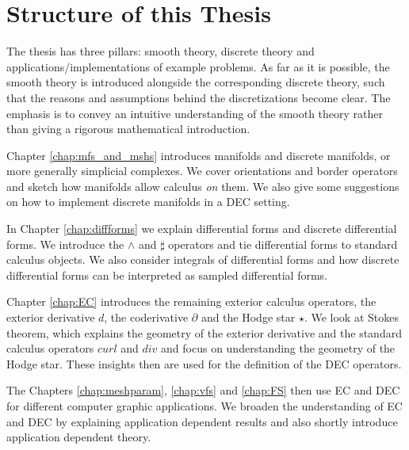 
\section{Structure of this Thesis}
The thesis has three pillars: smooth theory, discrete theory and applications/implementations of example problems. As far as it is possible, the smooth theory is introduced alongside the corresponding discrete theory, such that the reasons and assumptions behind the discretizations become clear. The emphasis is to convey an intuitive understanding of the smooth theory rather than giving a rigorous mathematical introduction. 

Chapter \ref{chap:mfs_and_mshs} introduces manifolds and discrete manifolds, or more generally simplicial complexes. We cover orientations and border operators and sketch how manifolds allow calculus \emph{on} them. We also give some suggestions on how to implement discrete manifolds in a DEC setting.

In Chapter \ref{chap:diffforms} we explain differential forms and discrete differential forms. We introduce the $\wedge$ and $\sharp$ operators and tie  differential forms to standard calculus objects. We also consider integrals of differential forms and how discrete differential forms can be interpreted as sampled differential forms.

Chapter \ref{chap:EC} introduces the remaining exterior calculus operators, the exterior derivative $d$, the coderivative $\partial$ and the Hodge star $\star$. We look at Stokes theorem, which explains the geometry of the exterior derivative and the standard calculus operators $curl$ and $div$ and focus on understanding the geometry of the Hodge star. These insights then are used for the definition of the DEC operators. 

The Chapters \ref{chap:meshparam}, \ref{chap:vfs} and \ref{chap:FS} then use EC and DEC for different computer graphic applications. We broaden the understanding of EC and DEC by explaining application dependent results and also shortly introduce application dependent theory.

